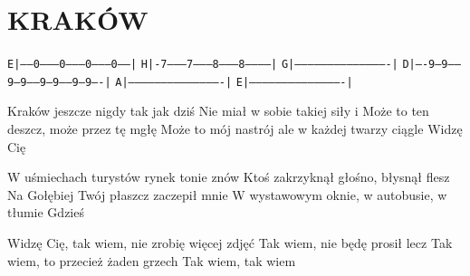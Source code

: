 \documentclass[../../../songbook.tex]{subfiles}
\begin{document}
\TabPositions{9cm} %
\section*{KRAKÓW}
{}
\vspace{0.5cm}
 \texttt{E|------0---------0---------0---------0------|}	\newline
 \texttt{H|-7---------7---------8---------8-----------|}	\newline
 \texttt{G|-------------------------------------------|}	\newline
 \texttt{D|----9---9-----9---9-----9---9-----9---9----|}	\newline
 \texttt{A|-------------------------------------------|}	\newline
 \texttt{E|-------------------------------------------|}	\newline

Kraków jeszcze nigdy tak jak dziś				 \newline
Nie miał w sobie takiej siły i					 \newline
Może to ten deszcz, może przez tę mgłę			 \newline
Może to mój nastrój ale w każdej twarzy ciągle	 \newline
Widzę Cię										 \newline

W uśmiechach turystów rynek tonie znów	 \newline
Ktoś zakrzyknął głośno, błysnął flesz 	\newline
Na Gołębiej Twój płaszcz zaczepił mnie 		\newline
W wystawowym oknie, w autobusie, w tłumie  \newline
Gdzieś \newline

\-\hspace{1cm} Widzę Cię, tak wiem, nie zrobię więcej zdjęć	 \newline
\-\hspace{1cm} Tak wiem, nie będę prosił lecz				 \newline
\-\hspace{1cm} Tak wiem, to przecież żaden grzech			 \newline
\-\hspace{1cm} Tak wiem, tak wiem							 \newline
\end{document}
